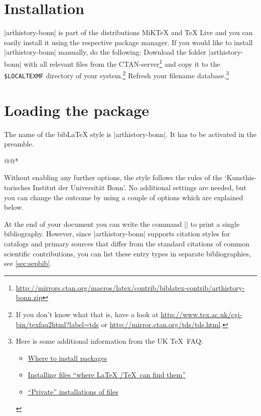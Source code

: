 \documentclass[a4paper,
10pt,
ngerman,
english
]{ltxdoc}
\begin{document}
\section{Installation}
|arthistory-bonn| is part of the distributions MiK\TeX{} and \TeX{} Live and you can easily install it using the respective package manager. 
If you would like to install |arthistory-bonn| manually, do the following:
Download the folder |arthistory-bonn| with all relevant files from the CTAN-server\footnote{\url{http://mirrors.ctan.org/macros/latex/contrib/biblatex-contrib/arthistory-bonn.zip}} and copy it to the \texttt{\$LOCALTEXMF} directory of
 your system.\footnote{If you don't know what that is, have a look at
\url{http://www.tex.ac.uk/cgi-bin/texfaq2html?label=tds} or 
\url{http://mirror.ctan.org/tds/tds.html}.} 
Refresh your filename database.\footnote{ 
Here is some additional information from the UK \TeX\ FAQ:
\begin{itemize}[nosep,after=\vspace{-\baselineskip} ]
  \item \href{%
    http://www.tex.ac.uk/cgi-bin/texfaq2html?label=install-where}{%
    Where to install packages}
  \item \href{%
    http://www.tex.ac.uk/cgi-bin/texfaq2html?label=inst-wlcf}{%
    Installing files \enquote{where \LaTeX{} /TeX\ can find them}}
  \item \href{%
    http://www.tex.ac.uk/cgi-bin/texfaq2html?label=privinst}{%
    \enquote{Private} installations of files}
\end{itemize}
}


\section{Loading the package}
  The name of the bib\LaTeX{} style is |arthistory-bonn|. It has to be activated in the preamble.

\begin{code}
\usepackage[style=arthistory-bonn,%
          *@@*]{biblatex}
@@*
\end{code}

Without enabling any further options, the style follows the rules of the \foreignquote*{ngerman}{Kunsthistorisches Institut der Universität Bonn}. No additional settings are needed, but you can change the outcome by using a couple of options which are explained below.

At the end of your document you can write the command |\printbibliography| to print 
a single bibliography.
However, since |arthistory-bonn| supports citation styles for catalogs and primary sources that differ from the standard citations of common scientific contributions, you can list these entry types in separate bibliographies, see \cref{sec:sepbib}.
\end{document}
